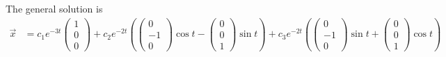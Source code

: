 \begin{parts}
    \ifnum {} {\color{DarkBlue} 
The general solution is
\begin{align}
    \vec x &= 
    c_1 e^{-3t}\begin{pmatrix} 1\\0\\0\end{pmatrix}
    + c_2 e^{-2t} \left( \begin{pmatrix} 0\\-1\\0\end{pmatrix} \cos t - \begin{pmatrix} 0\\0\\1 \end{pmatrix} \sin t \right)
    + c_3 e^{-2t} \left( \begin{pmatrix} 0\\-1\\0\end{pmatrix} \sin t + \begin{pmatrix} 0\\0\\1 \end{pmatrix} \cos t \right)
\end{align}
\newpage
} 
\else 
\vspace{3cm}
\fi
\end{parts}

\fi

